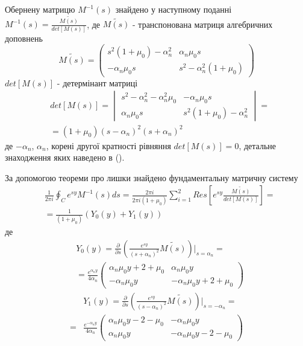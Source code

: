 Обернену матрицю $M^{-1}(s)$ знайдено у наступному поданні $M^{-1}(s) = \frac{\widetilde{M(s)}}{det[M(s)]}$, 
де $\widetilde{M(s)}$ - транспонована матриця алгебричних доповнень
\begin{equation}
    \widetilde{M(s)} = \begin{pmatrix}
        s^2 (1 + \mu_0) -\alpha_n^2 & \alpha_n \mu_0 s \\
        -\alpha_n \mu_0 s & s^2 -\alpha_n^2(1 + \mu_0)
     \end{pmatrix}
\end{equation}
$det[M(s)]$ - детермінант матриці
\begin{align}
    &det[M(s)] = \begin{vmatrix}
        s^2 - \alpha_n^2 - \alpha_n^2\mu_0 & -\alpha_n \mu_0 s \\
        \alpha_n \mu_0 s & s^2 (1 + \mu_0) -\alpha_n^2
     \end{vmatrix} = \nonumber \\
    &=(1+\mu_0)(s - \alpha_n)^2(s + \alpha_n)^2
\end{align}
де $-\alpha_n$, $\alpha_n$, корені другої кратності рівняння $det[M(s)]=0$, детальне знаходження яких наведено в ().

За допомогою теореми про лишки знайдено фундаментальну матричну систему
\begin{align*}
    &\frac{1}{2\pi i} \oint_C e^{sy} M^{-1}(s)ds = \frac{2 \pi i}{2 \pi i (1 + \mu_0)} \sum_{i=1}^{2} Res\left[ e^{sy} \frac{\widetilde{M(s)}}{det[M(s)]} \right] = \\
    & = \frac{1}{(1 + \mu_0)} \left(Y_0(y) + Y_1(y) \right)
\end{align*}
де
\begin{align}
    &Y_0(y) =  \frac{\partial}{\partial s} \left( \frac{e^{sy}}{(s+\alpha_n)^2} \widetilde{M(s)} \right) \Big|_{s=\alpha_n} = \nonumber \\
    &=\frac{e^{\alpha_n y}}{4\alpha_n} \begin{pmatrix}
    \alpha_n \mu_0 y + 2 + \mu_0 & \alpha_n \mu_0 y \\
    -\alpha_n \mu_0 y & -\alpha_n \mu_0 y + 2 + \mu_0
    \end{pmatrix}
\end{align}
\begin{align}
    &Y_1(y) = \frac{\partial}{\partial s} \left(\frac{e^{sy}}{(s-\alpha_n)^2} \widetilde{M(s)} \right) \Big|_{s=-\alpha_n} = \nonumber \\
    =&\frac{e^{-\alpha_n y}}{4\alpha_n} \begin{pmatrix}
    \alpha_n \mu_0 y - 2 - \mu_0 & -\alpha_n \mu_0 y \\
    \alpha_n \mu_0 y & -\alpha_n \mu_0 y - 2 - \mu_0
    \end{pmatrix}
\end{align}

